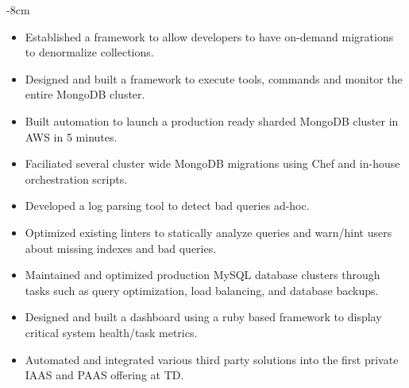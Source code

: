 \documentclass[10pt,a4paper,academicons]{altacv}
\begin{document}

\begin{adjustwidth}{}{-8cm}
\makecvheader
\end{adjustwidth}


\begin{itemize}
\item Established a framework to allow developers to have on-demand migrations to denormalize collections.
\item Designed and built a framework to execute tools, commands and monitor the entire MongoDB cluster.
\item Built automation to launch a production ready sharded MongoDB cluster in AWS in 5 minutes.
\item Faciliated several cluster wide MongoDB migrations using Chef and  in-house orchestration scripts.
\item Developed a log parsing tool to detect bad queries ad-hoc.
\item Optimized existing linters to statically analyze queries and warn/hint users about missing indexes and bad queries. 
\end{itemize}

\divider

\begin{itemize}
\item Maintained and optimized production MySQL database clusters through tasks such as query optimization, load balancing, and database backups.
\item Designed and built a dashboard using a ruby based framework to display critical system health/task metrics.
\end{itemize}

\divider

\begin{itemize}
\item Automated and integrated various third party solutions into the first private IAAS and PAAS offering at TD.
\end{itemize}
\end{document}

